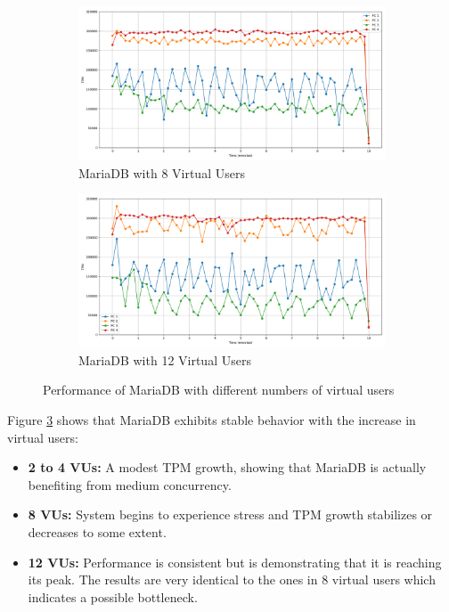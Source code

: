 \begin{figure}[H]
    \vspace{0.5cm}

    \hspace*{-1.7cm}
    \begin{subfigure}[b]{0.6\textwidth}
        \centering
        \includegraphics[width=\linewidth]{Images/hdbtcount_MariaDB_8.png}
        \caption{MariaDB with 8 Virtual Users}
        \label{fig:mariadb-8vu}
    \end{subfigure}%
    \begin{subfigure}[b]{0.6\textwidth}
        \centering
        \includegraphics[width=\linewidth]{Images/hdbtcount_MariaDB_12.png}
        \caption{MariaDB with 12 Virtual Users}
        \label{fig:mariadb-12vu}
    \end{subfigure}

    \caption{Performance of MariaDB with different numbers of virtual users}
    \label{fig:mariadb-all}
\end{figure}

Figure \ref{fig:mariadb-all} shows that MariaDB exhibits stable behavior with the increase in virtual users:

\begin{itemize}
    \setlength\itemsep{0.1em}
    \item \textbf{2 to 4 VUs:} A modest TPM growth, showing that MariaDB is actually benefiting from medium concurrency.
    \item \textbf{8 VUs:} System begins to experience stress and TPM growth stabilizes or decreases to some extent.
    \item \textbf{12 VUs:} Performance is consistent but is demonstrating that it is reaching its peak. The results are very identical to the ones in 8 virtual users which indicates a possible bottleneck.
\end{itemize}

